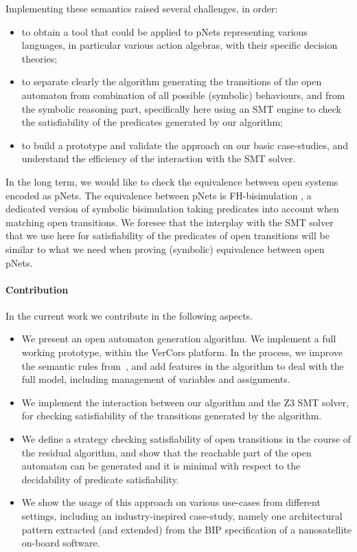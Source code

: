 \documentclass[smallcondensed]{svjour3}
\begin{document}
Implementing these semantics raised several challenges, in order:
\begin{itemize}
	\item to obtain a tool that could be applied to pNets representing
	various languages, in particular various action algebras,
	with their specific decision theories;
	\item to separate clearly the 
	algorithm generating the transitions of the open automaton from
	combination of all possible (symbolic) behaviours, and from
	the symbolic reasoning part, specifically here using an SMT
	engine to check the
	satisfiability of the predicates generated by our algorithm;
	\item to build a prototype and validate the approach on our basic
	case-studies, and understand the efficiency of the interaction
	with the SMT solver.
\end{itemize}

In the long term, we would like to check the equivalence between
open systems encoded as pNets. The equivalence between pNets is
FH-bisimulation \cite{henrio:Forte2016}, a dedicated version of
symbolic bisimulation taking 
predicates into account when matching 
open transitions. We foresee that the interplay with the SMT solver
that we use here for satisfiability of the predicates of open transitions will be
similar to what we need when proving (symbolic) equivalence between open
pNets. 

\paragraph{Contribution}
In the current work we contribute in the following aspects.
\begin{itemize}
	\item We present an open automaton generation algorithm. We
	implement a full working prototype, within the 
	VerCors platform. In the process, we improve the
	semantic rules from~\cite{henrio:Forte2016}, and add features in
	the algorithm to deal with the full 
	model, including management of variables and assignments.
	\item We implement the interaction between our algorithm and the Z3
	SMT solver, for checking satisfiability of the transitions
	generated by the algorithm.
	\item We define a strategy checking satisfiability of open transitions in the course of the residual algorithm, and show that  the reachable part of the open automaton can be generated and it is minimal with respect to the decidability of predicate satisfiability.
	\item We show the usage of this approach on various use-cases from different settings, including an
	industry-inspired case-study, namely one architectural pattern
	extracted (and extended) from the BIP specification of a nanosatellite on-board
	software.
\end{itemize}
\end{document}

